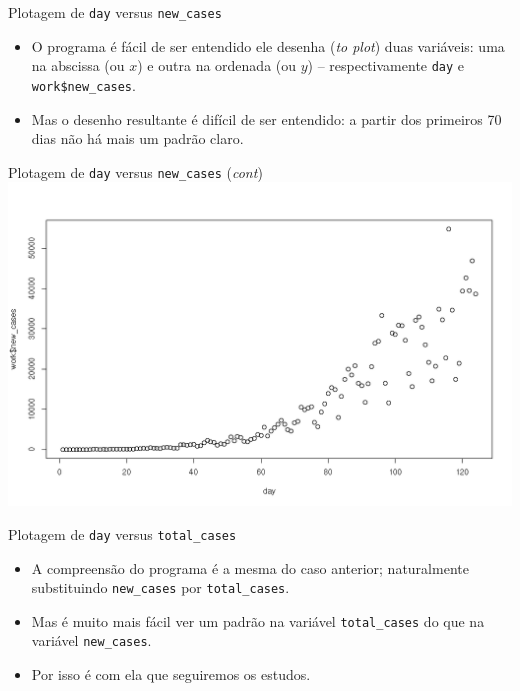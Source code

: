 \documentclass[a4paper,10pt]{beamer}
\begin{document}
\begin{frame}{Plotagem de {\tt day} versus {\tt new\_cases}}
  
  
  \begin{itemize}
      \item O programa é fácil de ser entendido ele desenha ({\em to plot})
	  duas variáveis: uma na abscissa (ou $x$) e outra na ordenada 
	  (ou $y$) -- respectivamente {\tt day} e 
	  {\tt work\$new\_cases}.
      \item Mas o desenho resultante é difícil de ser entendido: a partir 
	  dos primeiros 70 dias não há mais um padrão claro.
  \end{itemize}

\end{frame}

\begin{frame}{ Plotagem de {\tt day} versus {\tt new\_cases} ({\em cont}) }
   \includegraphics[scale=0.375]{plot-dayXnew_cases.png}

\end{frame}

\begin{frame}{ Plotagem de {\tt day} versus  {\tt total\_cases}}
  
  
  \begin{itemize}
      \item A compreensão do programa é a mesma do caso anterior; naturalmente
	  substituindo {\tt new\_cases} por {\tt total\_cases}.
	  
      \item Mas é muito mais fácil ver um padrão na variável {\tt total\_cases}
	  do que na variável {\tt new\_cases}.
	  
      \item Por isso é com ela que seguiremos os estudos.
  \end{itemize}

\end{frame}
\end{document}
